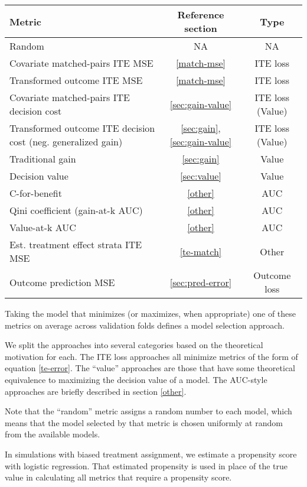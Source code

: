 \begin{center}
\begin{tabu}{|m{6cm}|c|c|}
	\hline
	 \rowfont[c]{\bfseries} Metric & Reference section & Type \\
	 \hline
	 Random & NA &  NA \\
	 \hline
	 Covariate matched-pairs ITE MSE & \ref{match-mse} & ITE loss \\
	 Transformed outcome ITE MSE & \ref{match-mse} & ITE loss \\
	 Covariate matched-pairs ITE decision cost &  \ref{sec:gain-value} & ITE loss (Value) \\
	 Transformed outcome ITE decision cost (neg. generalized gain) &  \ref{sec:gain}, \ref{sec:gain-value} & ITE loss (Value) \\
	 \hline
	 Traditional gain &  \ref{sec:gain} & Value \\ 
	 Decision value &  \ref{sec:value} & Value \\
	 \hline
	 C-for-benefit &  \ref{other} & AUC \\
	 Qini coefficient (gain-at-k AUC) &  \ref{other} & AUC \\
	 Value-at-k AUC &  \ref{other} & AUC \\
	 \hline
	 Est. treatment effect strata ITE MSE &  \ref{te-match} & Other \\
	 \hline
	 Outcome prediction MSE &  \ref{sec:pred-error} & Outcome loss \\
	 \hline
\end{tabu}
\end{center}

Taking the model that minimizes (or maximizes, when appropriate) one of these metrics on average across validation folds defines a model selection approach. 

We split the approaches into several categories based on the theoretical motivation for each. The ITE loss approaches all minimize metrics of the form of equation \ref{te-error}. The ``value'' approaches are those that have some theoretical equivalence to maximizing the decision value of a model. The AUC-style approaches are briefly described in section \ref{other}. 

Note that the ``random'' metric assigns a random number to each model, which means that the model selected by that metric is chosen uniformly at random from the available models. 

In simulations with biased treatment assignment, we estimate a propensity score with logistic regression. That estimated propensity is used in place of the true value in calculating all metrics that require a propensity score.

